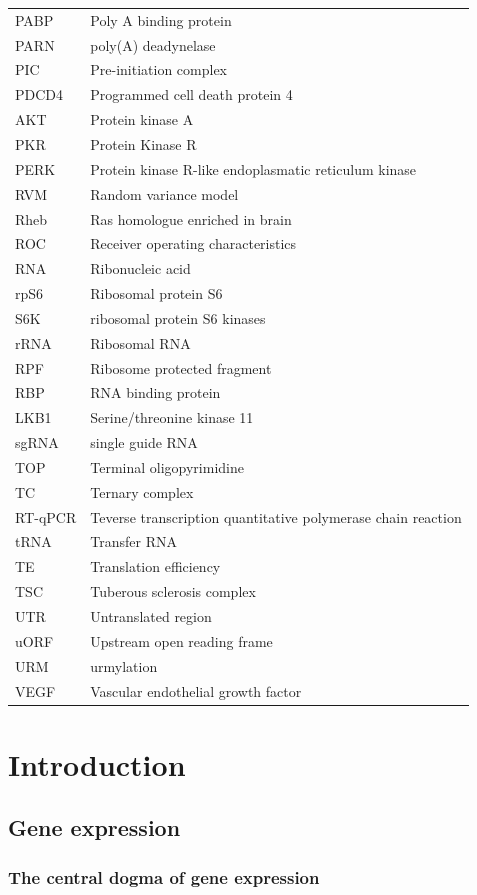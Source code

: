 \documentclass[12pt,openany]{book}
\begin{document}
\begin{longtable}{ll}
PABP & Poly A binding protein\\
PARN & poly(A) deadynelase\\
PIC & Pre-initiation complex\\
\addlinespace
PDCD4 & Programmed cell death protein 4\\
AKT & Protein kinase A\\
PKR & Protein Kinase R\\
PERK & Protein kinase R-like endoplasmatic reticulum kinase\\
RVM & Random variance model\\
\addlinespace
Rheb & Ras homologue enriched in brain\\
ROC & Receiver operating characteristics\\
RNA & Ribonucleic acid\\
rpS6 & Ribosomal protein S6\\
S6K & ribosomal protein S6 kinases\\
\addlinespace
rRNA & Ribosomal RNA\\
RPF & Ribosome protected fragment\\
RBP & RNA binding protein\\
LKB1 & Serine/threonine kinase 11\\
sgRNA & single guide RNA\\
\addlinespace
TOP & Terminal oligopyrimidine\\
TC & Ternary complex\\
RT-qPCR & Teverse transcription quantitative polymerase chain
reaction\\
tRNA & Transfer RNA\\
TE & Translation efficiency\\
\addlinespace
TSC & Tuberous sclerosis complex\\
UTR & Untranslated region\\
uORF & Upstream open reading frame\\
URM & urmylation\\
VEGF & Vascular endothelial growth factor\\*
\end{longtable}

\clearpage
{} \setcounter{page}{1}

\chapter{Introduction}\section{Gene expression}\subsection{The central dogma of gene expression}
\end{document}
